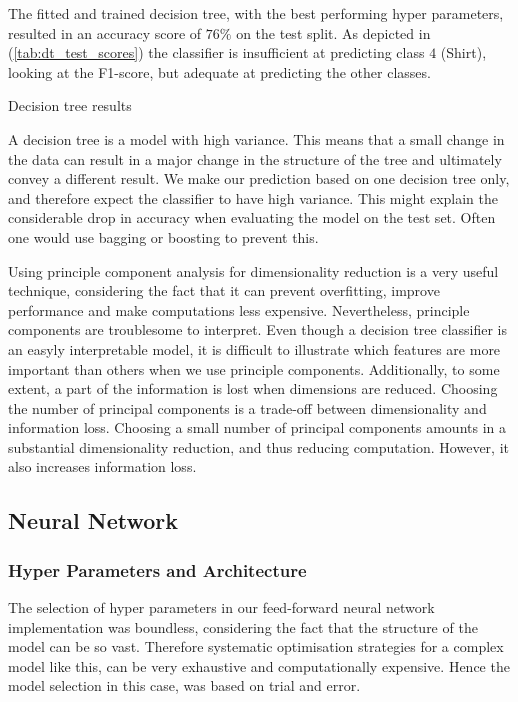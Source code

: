 \documentclass[../main.tex]{subfiles}
\begin{document}
The fitted and trained decision tree, with the best performing 
hyper parameters, resulted in an accuracy score of $76\%$ on the 
test split. As depicted in 
(\autoref{tab:dt_test_scores}) the classifier is  insufficient at 
predicting class $4$ (Shirt), looking at the F1-score, but 
adequate at predicting the other classes. 

\begin{table}[H]
    \centering
    
    \caption{Decision tree results}
    \label{tab:dt_test_scores}
\end{table}

A decision tree is a model with high variance. This means that a 
small change in the data can result in a major change in the 
structure of the tree and ultimately convey a different result. 
We make our prediction based on one decision tree only, and 
therefore expect the classifier to have high variance. This might 
explain the considerable drop in accuracy when evaluating the 
model on the test set. Often one would use bagging or boosting to 
prevent this. 

Using principle component analysis for dimensionality reduction 
is a very useful technique, considering the fact that it can 
prevent overfitting, improve performance and make computations 
less expensive. Nevertheless, principle components are 
troublesome to interpret. Even though a decision tree classifier 
is an easyly interpretable model, it is difficult to illustrate 
which features are more important than others when we use 
principle components. Additionally, to some extent, a part of the 
information is lost when dimensions are reduced. Choosing the 
number of principal components is a trade-off between 
dimensionality and information loss. Choosing a small number of 
principal components amounts in a substantial dimensionality 
reduction, and thus reducing computation. However, it also 
increases information loss.


\subsection{Neural Network}

\subsubsection{Hyper Parameters and Architecture}

The selection of hyper parameters in our feed-forward neural 
network implementation was boundless, considering the fact that 
the structure of the model can be so vast. Therefore systematic 
optimisation strategies for a complex model like this, can be 
very exhaustive and computationally expensive. Hence the model 
selection in this case, was based on trial and error. 
\end{document}
